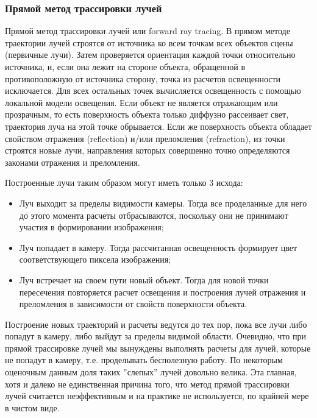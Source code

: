 \documentclass[12pt, a4paper, utf8]{article}
\begin{document}
\subsubsection{Прямой метод трассировки лучей}
Прямой метод трассировки лучей или forward ray tracing. В прямом методе траектории лучей строятся от источника ко всем точкам всех объектов сцены (первичные лучи). Затем проверяется ориентация каждой точки относительно источника, и, если она лежит на стороне объекта, обращенной в противоположную от источника сторону, точка из расчетов освещенности исключается. Для всех остальных точек вычисляется освещенность с помощью локальной модели освещения. Если объект не является отражающим или прозрачным, то есть поверхность объекта только диффузно рассеивает свет, траектория луча на этой точке обрывается. Если же поверхность объекта обладает свойством отражения (reflection) и/или преломления (refraction), из точки строятся новые лучи, направления которых совершенно точно определяются законами отражения и преломления. \par
	Построенные лучи таким образом могут иметь только 3 исхода:
	\begin{itemize}
		\item Луч выходит за пределы видимости камеры. Тогда все проделанные для него до этого момента расчеты отбрасываются, поскольку они не принимают участия в формировании изображения;
		\item Луч попадает в камеру. Тогда рассчитанная освещенность формирует цвет соответствующего пиксела изображения;
		\item Луч встречает на своем пути новый объект. Тогда для новой точки пересечения повторяется расчет освещения и построения лучей отражения и преломления в зависимости от свойств поверхности объекта.
	\end{itemize}
\par    
    Построение новых траекторий и расчеты ведутся до тех пор, пока все лучи либо попадут в камеру, либо выйдут за пределы видимой области. Очевидно, что при прямой трассировке лучей мы вынуждены выполнять расчеты для лучей, которые не попадут в камеру, т.е. проделывать бесполезную работу. По некоторым оценочным данным доля таких ''слепых'' лучей довольно велика. Эта главная, хотя и далеко не единственная причина того, что метод прямой трассировки лучей считается неэффективным и на практике не используется, по крайней мере в чистом виде.
\end{document}
